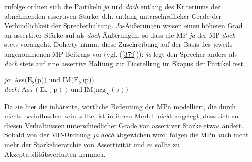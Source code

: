 \citet{Doherty1985, Doherty1987} zufolge ordnen sich die Partikeln \textit{ja} und \textit{doch} entlang des Kriteriums der  abnehmenden assertiven Stärke, d.h. entlang unterschiedlicher Grade der Verbindlichkeit der Sprecherhaltung. \textit{Ja}-Äußerungen weisen einen höheren Grad an assertiver Stärke auf als \textit{doch}-Äußerungen, so dass die MP \textit{ja} der MP \textit{doch} stets vorangeht. Doherty nimmt diese Zuschreibung auf der Basis des jeweils angenommenen MP-Beitrags vor (vgl. (\ref{379})): \textit{ja} legt den Sprecher anders als \textit{doch} stets auf eine assertive Haltung zur Einstellung im Skopus der Partikel fest.

\begin{exe}
	\ex\label{379} 
		\textit{ja}: Ass$(\textrm{E}_{\textrm{S}}$(\textrm{p})$)$ und I\textrm{M}$(\textrm{E}_{\textrm{X}}$(\textrm{p})$)$\\
		\textit{doch}: $\textrm{Ass}^{\prime} (\textrm{E}_{\textrm{S}}(\textrm{p})) \ \textrm{und IM(neg}_{\textrm{X}}(\textrm{p}))$
		\hfill\hbox {\citet[80/71]{Doherty1985}}
\end{exe}
Da sie hier die inhärente, wörtliche Bedeutung der MPn modelliert, die durch nichts beeinflussbar sein sollte, ist in ihrem Modell nicht angelegt, dass sich an diesen Verhältnissen unterschiedlicher Grade von assertiver Stärke etwas ändert. Sobald von der MP-Ordnung \textit{ja doch} abgewichen wird, folgen die MPn auch nicht mehr der Stärkehierarchie von Assertivität und es sollte zu Akzeptabilitätsverlusten kommen.

